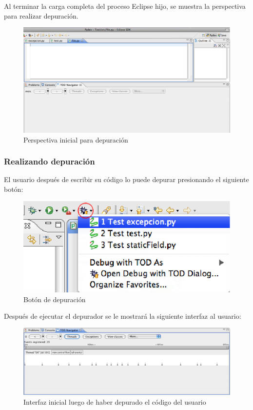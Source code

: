 \documentclass[12pt,legalpaper]{report}
\begin{document}
Al terminar la carga completa del proceso Eclipse hijo, se muestra la perspectiva para realizar depuración.

\begin{figure}[h]
	\centering
	\includegraphics[scale=0.4]{images/interfacesPlugin/arrancarTOD-3.eps}
	\caption{Perspectiva inicial para depuración}
\end{figure}

			\subsubsection{Realizando depuración}
			
El usuario después de escribir su código lo puede depurar presionando el siguiente botón:

\begin{figure}[h]
	\centering
	\includegraphics[scale=0.5]{images/interfacesPlugin/depuracionTOD.eps}
	\caption{Botón de depuración}
\end{figure}

Después de ejecutar el depurador se le mostrará la siguiente interfaz al usuario:

\begin{figure}[h]
	\centering
	\includegraphics[scale=0.4]{images/interfacesPlugin/depuracionTOD-2.eps}
	\caption{Interfaz inicial luego de haber depurado el código del usuario}
\end{figure}
\end{document}
